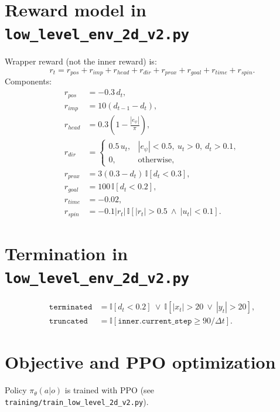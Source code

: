 \documentclass[11pt]{article}
\begin{document}
\section{Reward model in \texttt{low\_level\_env\_2d\_v2.py}}
Wrapper reward (not the inner reward) is:
\begin{equation}
r_t = r_{pos}+r_{imp}+r_{head}+r_{dir}+r_{prox}+r_{goal}+r_{time}+r_{spin}.
\end{equation}
Components:
\begin{align}
r_{pos} &= -0.3\,d_t,\\
r_{imp} &= 10(d_{t-1}-d_t),\\
r_{head} &= 0.3\left(1-\frac{|e_\psi|}{\pi}\right),\\
r_{dir} &=
\begin{cases}
0.5\,u_t,& |e_\psi|<0.5,\ u_t>0,\ d_t>0.1,\\
0,&\text{otherwise},
\end{cases}\\
r_{prox} &= 3(0.3-d_t)\,\mathbb{I}[d_t<0.3],\\
r_{goal} &= 100\,\mathbb{I}[d_t<0.2],\\
r_{time} &= -0.02,\\
r_{spin} &= -0.1|r_t|\,\mathbb{I}[|r_t|>0.5\ \land\ |u_t|<0.1].
\end{align}

\section{Termination in \texttt{low\_level\_env\_2d\_v2.py}}
\begin{align}
\texttt{terminated}&=\mathbb{I}[d_t<0.2]\ \lor\ \mathbb{I}[|x_t|>20\ \lor\ |y_t|>20],\\
\texttt{truncated}&=\mathbb{I}[\texttt{inner.current\_step} \ge 90/\Delta t].
\end{align}

\section{Objective and PPO optimization}
Policy \(\pi_\theta(a|o)\) is trained with PPO (see \texttt{training/train\_low\_level\_2d\_v2.py}).
\end{document}
